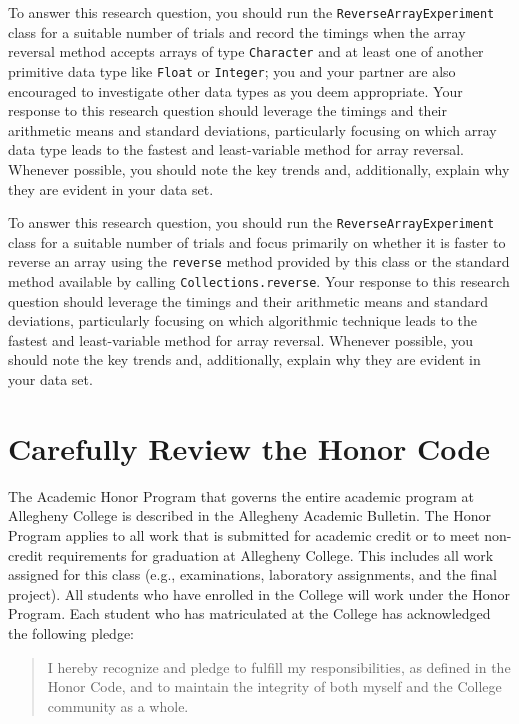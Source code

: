  To
answer this research question, you should run the {\tt ReverseArrayExperiment} class for a suitable number of trials and
record the timings when the array reversal method accepts arrays of type {\tt Character} and at least one of another
primitive data type like {\tt Float} or {\tt Integer}; you and your partner are also encouraged to investigate other
data types as you deem appropriate. Your response to this research question should leverage the timings and their
arithmetic means and standard deviations, particularly focusing on which array data type leads to the fastest and
least-variable method for array reversal.  Whenever possible, you should note the key trends and, additionally, explain
why they are evident in your data set.

 To answer this research question, you should run the {\tt ReverseArrayExperiment} class for a suitable number
of trials and focus primarily on whether it is faster to reverse an array using the {\tt reverse} method provided by
this class or the standard method available by calling {\tt Collections.reverse}.  Your response to this research
question should leverage the timings and their arithmetic means and standard deviations, particularly focusing on which
algorithmic technique leads to the fastest and least-variable method for array reversal. Whenever possible, you should
note the key trends and, additionally, explain why they are evident in your data set.

\section*{Carefully Review the Honor Code}

The Academic Honor Program that governs the entire academic program at Allegheny College is described in the Allegheny
Academic Bulletin.  The Honor Program applies to all work that is submitted for academic credit or to meet non-credit
requirements for graduation at Allegheny College. This includes all work assigned for this class (e.g., examinations,
laboratory assignments, and the final project). All students who have enrolled in the College will work under the Honor
Program.  Each student who has matriculated at the College has acknowledged the following pledge:

\vspace*{-.1in}
\begin{quote}
  I hereby recognize and pledge to fulfill my responsibilities, as defined in the Honor Code, and to maintain the
  integrity of both myself and the College community as a whole.
\end{quote}
\vspace*{-.1in}


